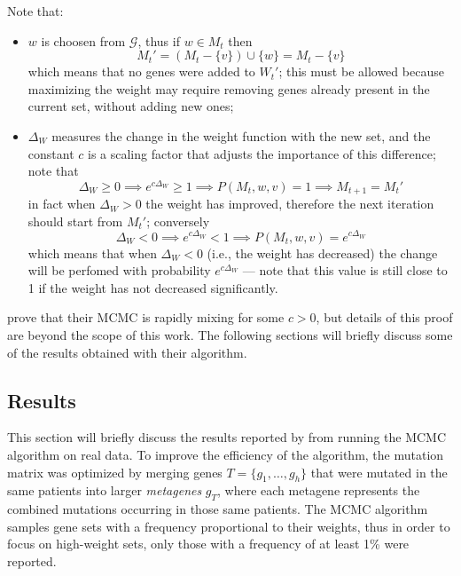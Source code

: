 Note that:

\begin{itemize}
    \item $w$ is choosen from $\mathcal G$, thus if $w \in M_t$ then $$M_t' = (M_t - \{v\}) \cup \{w\} = M_t - \{v\}$$ which means that no genes were added to $W_t'$; this must be allowed because maximizing the weight may require removing genes already present in the current set, without adding new ones;
    \item $\Delta_W$ measures the change in the weight function with the new set, and the constant $c$ is a scaling factor that adjusts the importance of this difference; note that $$\Delta_W \ge 0 \implies e^{c \Delta_W} \ge 1 \implies P(M_t, w, v) = 1 \implies M_{t + 1} = M_t'$$ in fact when $\Delta_W > 0$ the weight has improved, therefore the next iteration should start from $M_t'$; conversely $$\Delta_W < 0 \implies e^{c \Delta_W} < 1 \implies P(M_t, w, v) = e ^{c \Delta_W}$$ which means that when $\Delta_W < 0$ (i.e., the weight has decreased) the change will be perfomed with probability $e^{c \Delta_W}$ --- note that this value is still close to 1 if the weight has not decreased significantly.
\end{itemize}

\textcite{dendrix} prove that their MCMC is rapidly mixing for some $c > 0$, but details of this proof are beyond the scope of this work. The following sections will briefly discuss some of the results obtained with their algorithm.

\subsection{Results} \label{results_dendrix}

This section will briefly discuss the results reported by \textcite{dendrix} from running the MCMC algorithm on real data. To improve the efficiency of the algorithm, the mutation matrix was optimized by merging genes $T = \{g_1, \ldots, g_h\}$ that were mutated in the same patients into larger \textit{metagenes} $g_T$, where each metagene represents the combined mutations occurring in those same patients. The MCMC algorithm samples gene sets with a frequency proportional to their weights, thus in order to focus on high-weight sets, only those with a frequency of at least 1\% were reported.

